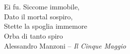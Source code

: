 \chapter*{}
\thispagestyle{empty}
\vspace*{3cm}

\begin{center}
\hfill Ei fu. Siccome immobile, \\
\hfill Dato il mortal sospiro, \\
\hfill Stette la spoglia immemore \\
\hfill Orba di tanto spiro \\ \medskip
\hfill Alessandro Manzoni -- \emph{Il Cinque Maggio}
\end{center}